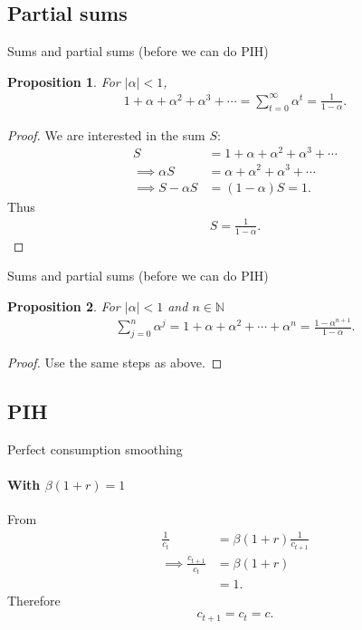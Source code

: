 \documentclass[presentation,dvipsnames]{beamer}
\newtheorem{prop}{Proposition}
\begin{document}
\subsection{Partial sums}
\begin{frame}[label=sec-2-3]{Sums and partial sums (before we can do PIH)}
\begin{prop}
\label{prop:2}
For $|\alpha| < 1$,
\begin{align*}
1 + \alpha + \alpha^{2} + \alpha^{3} + \cdots = \sum\limits_{t=0}^{\infty} \alpha^{t} = \frac{1}{1-\alpha}.
\end{align*}
\end{prop}
\begin{proof}
We are interested in the sum $S$:
\begin{align*}
S &= 1 + \alpha + \alpha^{2} + \alpha^{3} + \cdots \\
\implies \alpha S &= \alpha + \alpha^{2} + \alpha^{3} + \cdots \\
\implies S - \alpha S &= (1-\alpha)S = 1.
\end{align*}
Thus
\begin{align*}
S = \frac{1}{1-\alpha}.
\end{align*}
\end{proof}
\end{frame}

\begin{frame}[label=sec-2-3]{Sums and partial sums (before we can do PIH)}
\begin{prop}
\label{prop:2}
For $|\alpha| < 1$ and $n \in \mathbb{N}$
\begin{align*}
\sum\limits_{j=0}^{n} \alpha^{j} = 1+\alpha + \alpha^{2} + \cdots + \alpha^{n} = \frac{1-\alpha^{n+1}}{1-\alpha}.
\end{align*}
\end{prop}
\begin{proof}
Use the same steps as above.
\end{proof}
\end{frame}

\subsection{PIH}
\begin{frame}[label=sec-2-4]{Perfect consumption smoothing}
\framesubtitle{With $\beta (1+r) = 1$}
From
\begin{align*}
\frac{1}{c_{t}} &= \beta (1+r) \frac{1}{c_{t+1}} \\
\implies \frac{c_{t+1}}{c_{t}} &= \beta (1+r) \\
&= 1.
\end{align*}
Therefore
\begin{align*}
c_{t+1} = c_{t} = c.
\end{align*}
\end{frame}
\end{document}
